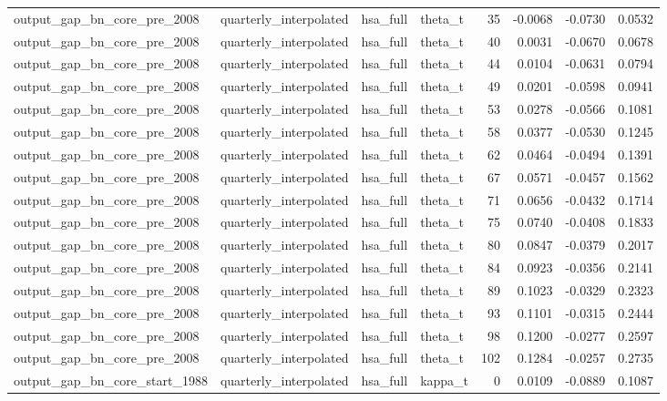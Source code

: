 \begin{tabular}{llllrrrr}
output\_gap\_bn\_core\_pre\_2008 & quarterly\_interpolated & hsa\_full & theta\_t & 35 & -0.0068 & -0.0730 & 0.0532 \\
output\_gap\_bn\_core\_pre\_2008 & quarterly\_interpolated & hsa\_full & theta\_t & 40 & 0.0031 & -0.0670 & 0.0678 \\
output\_gap\_bn\_core\_pre\_2008 & quarterly\_interpolated & hsa\_full & theta\_t & 44 & 0.0104 & -0.0631 & 0.0794 \\
output\_gap\_bn\_core\_pre\_2008 & quarterly\_interpolated & hsa\_full & theta\_t & 49 & 0.0201 & -0.0598 & 0.0941 \\
output\_gap\_bn\_core\_pre\_2008 & quarterly\_interpolated & hsa\_full & theta\_t & 53 & 0.0278 & -0.0566 & 0.1081 \\
output\_gap\_bn\_core\_pre\_2008 & quarterly\_interpolated & hsa\_full & theta\_t & 58 & 0.0377 & -0.0530 & 0.1245 \\
output\_gap\_bn\_core\_pre\_2008 & quarterly\_interpolated & hsa\_full & theta\_t & 62 & 0.0464 & -0.0494 & 0.1391 \\
output\_gap\_bn\_core\_pre\_2008 & quarterly\_interpolated & hsa\_full & theta\_t & 67 & 0.0571 & -0.0457 & 0.1562 \\
output\_gap\_bn\_core\_pre\_2008 & quarterly\_interpolated & hsa\_full & theta\_t & 71 & 0.0656 & -0.0432 & 0.1714 \\
output\_gap\_bn\_core\_pre\_2008 & quarterly\_interpolated & hsa\_full & theta\_t & 75 & 0.0740 & -0.0408 & 0.1833 \\
output\_gap\_bn\_core\_pre\_2008 & quarterly\_interpolated & hsa\_full & theta\_t & 80 & 0.0847 & -0.0379 & 0.2017 \\
output\_gap\_bn\_core\_pre\_2008 & quarterly\_interpolated & hsa\_full & theta\_t & 84 & 0.0923 & -0.0356 & 0.2141 \\
output\_gap\_bn\_core\_pre\_2008 & quarterly\_interpolated & hsa\_full & theta\_t & 89 & 0.1023 & -0.0329 & 0.2323 \\
output\_gap\_bn\_core\_pre\_2008 & quarterly\_interpolated & hsa\_full & theta\_t & 93 & 0.1101 & -0.0315 & 0.2444 \\
output\_gap\_bn\_core\_pre\_2008 & quarterly\_interpolated & hsa\_full & theta\_t & 98 & 0.1200 & -0.0277 & 0.2597 \\
output\_gap\_bn\_core\_pre\_2008 & quarterly\_interpolated & hsa\_full & theta\_t & 102 & 0.1284 & -0.0257 & 0.2735 \\
output\_gap\_bn\_core\_start\_1988 & quarterly\_interpolated & hsa\_full & kappa\_t & 0 & 0.0109 & -0.0889 & 0.1087 \\

\end{tabular}
